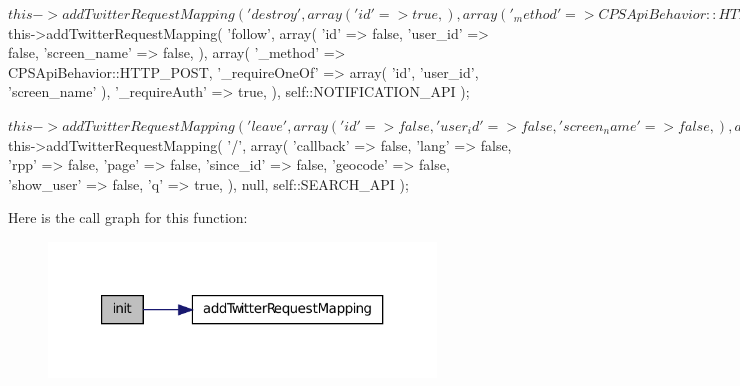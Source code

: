 \begin{DoxyCode}
{        $this->addTwitterRequestMapping( 'destroy',
            array(
                'id' => true,
            ),
            array(
                '_method' => CPSApiBehavior::HTTP_POST,
                '_requireAuth' => true,
            )
        );

        //***********************************************************************
      *********
        //* Notification API
        //***********************************************************************
      *********

        $this->addTwitterRequestMapping( 'follow',
            array(
                'id' => false,
                'user_id' => false,
                'screen_name' => false,
            ),
            array(
                '_method' => CPSApiBehavior::HTTP_POST,
                '_requireOneOf' => array( 'id', 'user_id', 'screen_name' ),
                '_requireAuth' => true,
            ),
            self::NOTIFICATION_API
        );

        $this->addTwitterRequestMapping( 'leave',
            array(
                'id' => false,
                'user_id' => false,
                'screen_name' => false,
            ),
            array(
                '_method' => CPSApiBehavior::HTTP_POST,
                '_requireOneOf' => array( 'id', 'user_id', 'screen_name' ),
                '_requireAuth' => true,
            )
        );
        
        //***********************************************************************
      *********
        //* Search API
        //***********************************************************************
      *********

        $this->addTwitterRequestMapping( '/',
            array(
                'callback' => false,
                'lang' => false,
                'rpp' => false,
                'page' => false,
                'since_id' => false,
                'geocode' => false,
                'show_user' => false,
                'q' => true,
            ),
            null,
            self::SEARCH_API
        );
        
    }
\end{DoxyCode}




Here is the call graph for this function:\nopagebreak
\begin{figure}[H]
\begin{center}
\leavevmode
\includegraphics[width=292pt]{classCPSTwitterApi_a4be4055f3361d4800e16bc2e2e38cda6_cgraph}
\end{center}
\end{figure}


